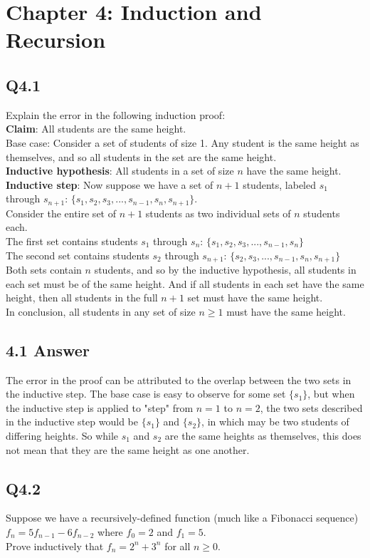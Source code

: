 \documentclass{article}
\begin{document}
\section*{Chapter 4: Induction and Recursion}
\subsection*{Q4.1}
Explain the error in the following induction proof:
\\ \textbf{Claim}: All students are the same height.
\\ Base case: Consider a set of students of size 1. Any student is the same height as themselves, and so all students in the set are the same height.
\\ \textbf{Inductive hypothesis}: All students in a set of size $n$ have the same height. 
\\ \textbf{Inductive step}: Now suppose we have a set of $n+1$ students, labeled $s_1$ through $s_{n+1}$: $\{s_1,s_2,s_3,...,s_{n-1},s_n,s_{n+1}\}$.
\\ Consider the entire set of $n+1$ students as two individual sets of $n$ students each.
\\ The first set contains students $s_1$ through $s_n$: $\{s_1,s_2,s_3,...,s_{n-1},s_n\}$
\\ The second set contains students $s_2$ through $s_{n+1}$: $\{s_2,s_3,...,s_{n-1},s_n,s_{n+1}\}$
\\ Both sets contain $n$ students, and so by the inductive hypothesis, all students in each set must be of the same height. And if all students in each set have the same height, then all students in the full $n+1$ set must have the same height.
\\ In conclusion, all students in any set of size $n\geq1$ must have the same height.
\newpage
\subsection*{4.1 Answer}
The error in the proof can be attributed to the overlap between the two sets in the inductive step. The base case is easy to observe for some set $\{s_1\}$, but when the inductive step is applied to "step" from $n=1$ to $n=2$, the two sets described in the inductive step would be $\{s_1\}$ and $\{s_2\}$, in which may be two students of differing heights. So while $s_1$ and $s_2$ are the same heights as themselves, this does not mean that they are the same height as one another.
\newpage
\subsection*{Q4.2}
Suppose we have a recursively-defined function (much like a Fibonacci sequence) $f_n=5f_{n-1}-6f_{n-2}$ where $f_0=2$ and $f_1=5$.
\\ Prove inductively that $f_n=2^n+3^n$ for all $n\geq0$.
\newpage
\end{document}
